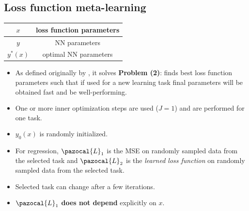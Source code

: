 \subsection{Loss function meta-learning}
\begin{center}
	\begin{tabular}{ | c || c |} 
		\hline
		$x$ & loss function parameters \\
		\hline
		$y$ & NN parameters \\
		\hline
		$y^*(x)$ & optimal NN parameters \\
		\hline
	\end{tabular}
\end{center}
\begin{itemize}
	\item As defined originally by \textcite{bechtle2020metalearning}, it solves \textbf{Problem (2)}: finds best loss function parameters such that if used for a new learning task final parameters will be obtained fast and be well-performing.
	\item One or more inner optimization steps are used ($J = 1$) and are performed for one task.
	\item $y_0(x)$ is randomly initialized. 
	\item For regression, $\pazocal{L}_1$ is the MSE on randomly sampled data from the selected task and $\pazocal{L}_2$ is the \textit{learned loss function} on randomly sampled data from the selected task.
	\item Selected task can change after a few iterations. 
	\item $\pazocal{L}_1$ \textbf{does not depend} explicitly on $x$.
\end{itemize}

